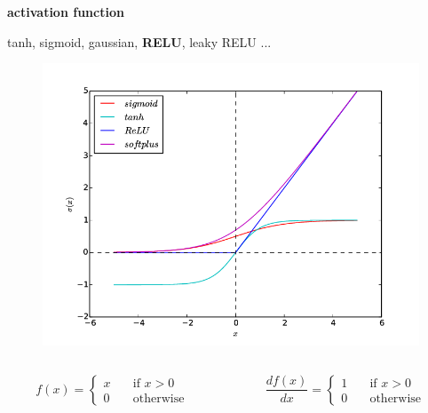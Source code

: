 \documentclass[xcolor=dvipsnames]{beamer}
\begin{document}
\begin{frame}[fragile]
{\bf activation function}

tanh, sigmoid, gaussian, {\bf RELU}, leaky RELU ...
\begin{figure}
  \includegraphics[scale=0.2]{../images/activation.png}
\end{figure}

\begin{columns}
\begin{column}{0.5\textwidth}
\[ f(x) =
  \begin{cases}
    x       & \quad \text{if } x > 0\\
    0       & \quad \text{otherwise}
  \end{cases}
\]
\end{column}
\begin{column}{0.5\textwidth}  %
\[ \frac{df(x)}{dx} =
  \begin{cases}
    1       & \quad \text{if } x > 0\\
    0       & \quad \text{otherwise}
  \end{cases}
\]
\end{column}
\end{columns}

\end{frame}
\end{document}

